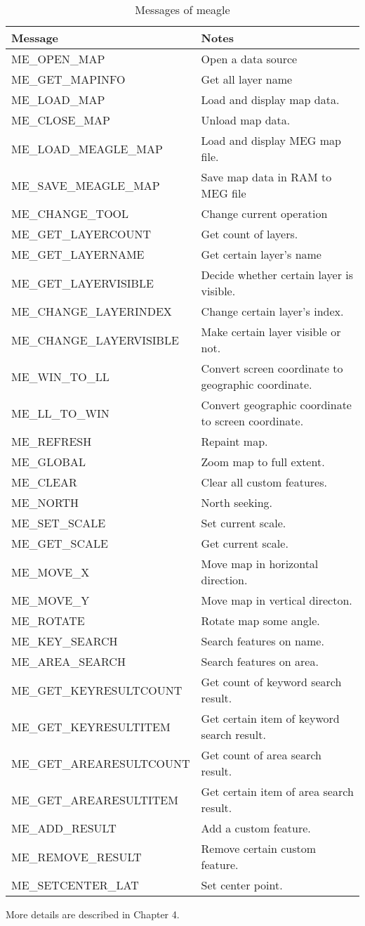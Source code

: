 \documentclass[a4paper]{article}
\begin{document}
\begin{table}
\centering
\caption{Messages of meagle}
\begin{tabular}{ll}
\hline
Message  & Notes \\[5pt] \hline
ME\_OPEN\_MAP & Open a data source \\ 
ME\_GET\_MAPINFO  & Get all layer name  \\ 
ME\_LOAD\_MAP & Load and display map data. \\ 
ME\_CLOSE\_MAP & Unload map data. \\ 
ME\_LOAD\_MEAGLE\_MAP & Load and display MEG map file. \\ 
ME\_SAVE\_MEAGLE\_MAP & Save map data in RAM to MEG file \\ 
ME\_CHANGE\_TOOL & Change current operation  \\ 
ME\_GET\_LAYERCOUNT & Get count of layers. \\ 
ME\_GET\_LAYERNAME & Get certain layer's name \\ 
ME\_GET\_LAYERVISIBLE & Decide whether certain layer is visible.  \\ 
ME\_CHANGE\_LAYERINDEX & Change certain layer's index. \\ 
ME\_CHANGE\_LAYERVISIBLE & Make certain layer visible or not. \\ 
ME\_WIN\_TO\_LL & Convert screen coordinate to geographic coordinate.  \\ 
ME\_LL\_TO\_WIN & Convert geographic coordinate to screen coordinate.  \\ 
ME\_REFRESH & Repaint map. \\ 
ME\_GLOBAL & Zoom map to full extent. \\ 
ME\_CLEAR & Clear all custom features. \\ 
ME\_NORTH & North seeking. \\ 
ME\_SET\_SCALE & Set current scale. \\ 
ME\_GET\_SCALE & Get current scale. \\ 
ME\_MOVE\_X & Move map in horizontal direction. \\ 
ME\_MOVE\_Y & Move map in vertical directon. \\ 
ME\_ROTATE & Rotate map some angle. \\ 
ME\_KEY\_SEARCH & Search features on name. \\ 
ME\_AREA\_SEARCH & Search features on area. \\ 
ME\_GET\_KEYRESULTCOUNT & Get count of keyword search result. \\ 
ME\_GET\_KEYRESULTITEM & Get certain item of keyword search result. \\ 
ME\_GET\_AREARESULTCOUNT & Get count of area search result.\\ 
ME\_GET\_AREARESULTITEM & Get certain item of area search result. \\ 
ME\_ADD\_RESULT & Add a custom feature. \\ 
ME\_REMOVE\_RESULT & Remove certain custom feature. \\ 
ME\_SETCENTER\_LAT & Set center point. \\ \hline
\end{tabular}
\end{table}   
More details are described in Chapter 4.
\end{document}
